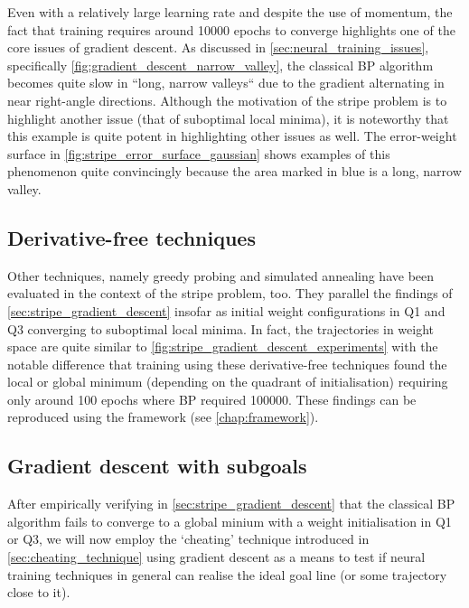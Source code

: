 Even with a relatively large learning rate and despite the use of momentum, the fact that training requires around 10000 epochs to converge highlights one of the core issues of gradient descent.
As discussed in \ref{sec:neural_training_issues}, specifically \ref{fig:gradient_descent_narrow_valley}, the classical BP algorithm becomes quite slow in ``long, narrow valleys`` \cite[421]{press1992} due to the gradient alternating in near right-angle directions.
Although the motivation of the stripe problem is to highlight another issue (that of suboptimal local minima), it is noteworthy that this example is quite potent in highlighting other issues as well.
The error-weight surface in \ref{fig:stripe_error_surface_gaussian} shows examples of this phenomenon quite convincingly because the area marked in blue is a long, narrow valley.

\subsection{Derivative-free techniques}
\label{sec:local_minimum_experiments_derivative_free}
Other techniques, namely greedy probing and simulated annealing have been evaluated in the context of the stripe problem, too.
They parallel the findings of \ref{sec:stripe_gradient_descent} insofar as initial weight configurations in Q1 and Q3 converging to suboptimal local minima.
In fact, the trajectories in weight space are quite similar to \ref{fig:stripe_gradient_descent_experiments} with the notable difference that training using these derivative-free techniques found the local or global minimum (depending on the quadrant of initialisation) requiring only around 100 epochs where BP required 100000. 
These findings can be reproduced using the framework (see \ref{chap:framework}).

\subsection{Gradient descent with subgoals}
\label{sec:stripe_gradient_descent_subgoals}
After empirically verifying in \ref{sec:stripe_gradient_descent} that the classical BP algorithm fails to converge to a global minium with a weight initialisation in Q1 or Q3, we will now employ the `cheating' technique introduced in \ref{sec:cheating_technique} using gradient descent as a means to test if neural training techniques in general can realise the ideal goal line (or some trajectory close to it).

